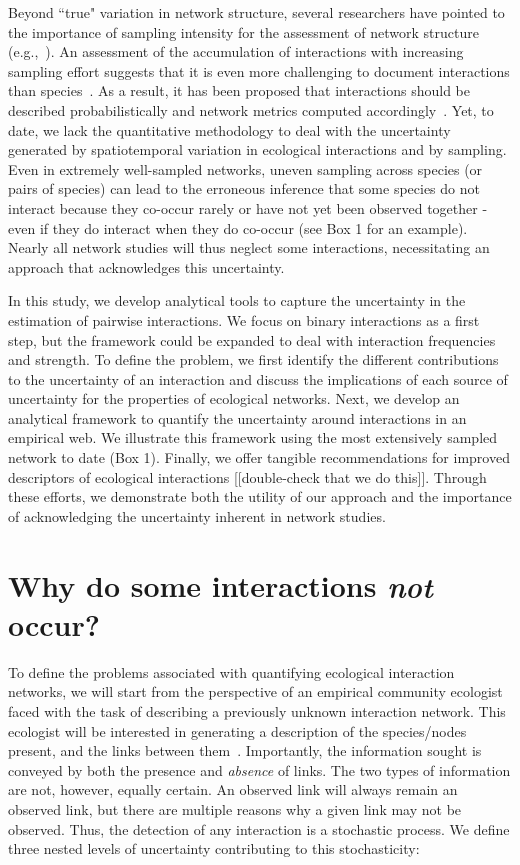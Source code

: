 \documentclass[12pt]{article}
\begin{document}
\begin{spacing}{2.0}
    Beyond ``true" variation in network structure, several researchers have pointed to the importance of sampling intensity for the assessment of network structure (e.g.,~\citealp{Martinez1999,Bluthgen2006,Bluthgen2007}). An assessment of the accumulation of interactions with increasing sampling effort suggests that it is even more challenging to document interactions than species~\citep{Poisot2012}. As a result, it has been proposed that interactions should be described probabilistically and network metrics computed accordingly~\citep{Poisot2016}. Yet, to date, we lack the quantitative methodology to deal with the uncertainty generated by spatiotemporal variation in ecological interactions and by sampling. Even in extremely well-sampled networks, uneven sampling across species (or pairs of species) can lead to the erroneous inference that some species do not interact because they co-occur rarely or have not yet been observed together - even if they do interact when they do co-occur (see Box 1 for an example). Nearly all network studies will thus neglect some interactions, necessitating an approach that acknowledges this uncertainty.


    In this study, we develop analytical tools to capture the uncertainty in the estimation of pairwise interactions. We focus on binary interactions as a first step, but the framework could be expanded to deal with interaction frequencies and strength. To define the problem, we first identify the different contributions to the uncertainty of an interaction and discuss the implications of each source of uncertainty for the properties of ecological networks. Next, we develop an analytical framework to quantify the uncertainty around interactions in an empirical web. We illustrate this framework using the most extensively sampled network to date (Box 1).  Finally, we offer tangible recommendations for improved descriptors of ecological interactions [[double-check that we do this]]. Through these efforts, we demonstrate both the utility of our approach and the importance of acknowledging the uncertainty inherent in network studies.


\section*{Why do some interactions \emph{not} occur?}

  To define the problems associated with quantifying ecological interaction networks, we will start from the perspective of an empirical community ecologist faced with the task of describing a previously unknown interaction network. This ecologist will be interested in generating a description of the species/nodes present, and the links between them~\citep{Roslin2016}.  Importantly, the information sought is conveyed by both the presence and \emph{absence} of links. The two types of information are not, however, equally certain. An observed link will always remain an observed link, but there are multiple reasons why a given link may not be observed. Thus, the detection of any interaction is a stochastic process. We define three nested levels of uncertainty contributing to this stochasticity:


\end{spacing}
\end{document}

